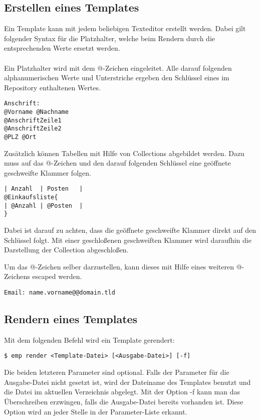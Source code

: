 \subsection{Erstellen eines Templates}
Ein Template kann mit jedem beliebigen Texteditor erstellt werden. Dabei gilt folgender Syntax für die Platzhalter, welche beim Rendern durch die entsprechenden Werte ersetzt werden.
\\\\
Ein Platzhalter wird mit dem @-Zeichen eingeleitet. Alle darauf folgenden alphanumerischen Werte und Unterstriche ergeben den Schlüssel eines im Repository enthaltenen Wertes.
\vspace{0.5em}
\begin{lstlisting}[style=Bash]
Anschrift:
@Vorname @Nachname
@AnschriftZeile1
@AnschriftZeile2
@PLZ @Ort
\end{lstlisting}

Zusätzlich können Tabellen mit Hilfe von Collections abgebildet werden. Dazu muss auf das @-Zeichen und den darauf folgenden Schlüssel eine geöffnete geschweifte Klammer folgen.
\vspace{0.5em}
\begin{lstlisting}[style=Bash]
| Anzahl  | Posten   |
@Einkaufsliste{
| @Anzahl | @Posten  |
}
\end{lstlisting}

Dabei ist darauf zu achten, dass die geöffnete geschweifte Klammer direkt auf den Schlüssel folgt. Mit einer geschloßenen geschweiften Klammer wird daraufhin die Darstellung der Collection abgeschloßen.

Um das @-Zeichen selber darzustellen, kann dieses mit Hilfe eines weiteren @-Zeichens escaped werden.

\begin{lstlisting}[style=Bash]
Email: name.vorname@@domain.tld
\end{lstlisting}

\subsection{Rendern eines Templates}
Mit dem folgenden Befehl wird ein Template gerendert:
\begin{lstlisting}[style=Bash]
$ emp render <Template-Datei> [<Ausgabe-Datei>] [-f]
\end{lstlisting}

Die beiden letzteren Parameter sind optional. Falls der Parameter für die Ausgabe-Datei nicht gesetzt ist, wird der Dateiname des Templates benutzt und die Datei im aktuellen Verzeichnis abgelegt. Mit der Option -f kann man das Überschreiben erzwingen, falls die Ausgabe-Datei bereits vorhanden ist. Diese Option wird an jeder Stelle in der Parameter-Liste erkannt.

